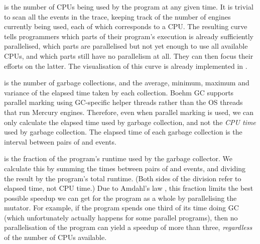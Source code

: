 
is the number of CPUs being used by the program at any given time.
It is trivial to scan all the events in the trace,
keeping track of the number of engines currently being used,
each of which corresponds to a CPU.
The resulting curve tells programmers
which parts of their program's execution is already sufficiently parallelised,
which parts are parallelised but not yet enough to use all available CPUs,
and which parts still have no parallelism at all.
They can then focus their efforts on the latter.
The visualisation of this curve is already implemented in \tscope
\citet{threadscope}.

 is the number of garbage collections,
and the average, minimum, maximum and variance
of the elapsed time taken by each collection.
Boehm GC supports parallel marking using GC-specific helper threads
rather than the OS threads that run Mercury engines.
Therefore, even when parallel marking is used,
we can only calculate the elapsed time used by garbage collection,
and not the \emph{CPU time} used by garbage collection.
The elapsed time of each garbage collection
is the interval between pairs of  and 
events.

is the fraction of the program's runtime used by the garbage collector.
We calculate this by summing the times
between pairs of  and  events,
and dividing the result by the program's total runtime.
(Both sides of the division refer to elapsed time, not CPU time.)
Due to Amdahl's law \citep{amdahl:1967:law},
this fraction limits the best possible speedup we can get
for the program as a whole by parallelising the mutator.
For example, if the program spends one third of its time doing GC
(which unfortunately actually happens for some parallel programs),
then no parallelisation of the program can yield a speedup of more than three,
\emph{regardless} of the number of CPUs available.

